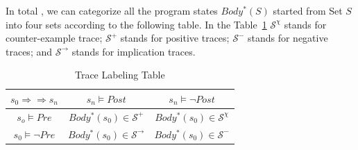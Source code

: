 In total , we can categorize all the program states $Body^*(S)$ started from Set $S$ into four sets according to the following table.
In the Table~\ref{tab:labeling}
$\mathcal{S}^\chi$ stands for counter-example trace;
$\mathcal{S}^+$ stands for positive traces;
$\mathcal{S}^-$ stands for negative traces; 
and $\mathcal{S}^\rightarrow$ stands for implication traces.

\begin{table}[htb]
\centering
\begin{tabular}[float]{|c|c|c|}
\hline
$s_0 \Rightarrow \Rightarrow s_n$ & $s_n \models Post$            & $s_n \models \neg Post$\\
\hline
$s_o \models Pre$                 & $Body^*(s_0) \in \mathcal{S}^+$       & $Body^*(s_0) \in \mathcal{S}^\chi$\\
\hline
$s_0 \models \neg Pre$            & $Body^*(s_0) \in \mathcal{S}^\rightarrow$       & $Body^*(s_0) \in \mathcal{S}^-$\\
\hline
\end{tabular}
\caption{Trace Labeling Table}
\label{tab:labeling}
\end{table}

